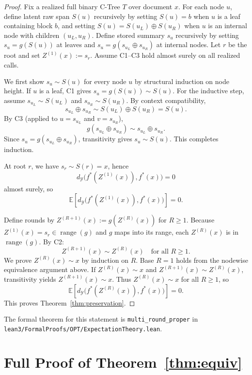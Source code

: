 \documentclass[11pt]{article}
\newcommand{\E}{\mathbb{E}}
\newcommand{\Y}{\mathcal{Y}}
\newcommand{\metric}{d_{\Y}}
\newcommand{\fstar}{f^\ast}
\newcommand{\concat}{\oplus}
\begin{document}
\begin{proof}
Fix a realized full binary C-Tree $T$ over document $x$.
For each node $u$, define latent raw span $S(u)$ recursively by setting $S(u)=b$ when $u$ is a leaf containing block $b$, and setting $S(u)=S(u_L)\concat S(u_R)$ when $u$ is an internal node with children $(u_L,u_R)$.
Define stored summary $s_u$ recursively by setting $s_u=g(S(u))$ at leaves and $s_u=g(s_{u_L}\concat s_{u_R})$ at internal nodes.
Let $r$ be the root and set $Z^{(1)}(x):=s_r$.
Assume C1--C3 hold almost surely on all realized calls.

We first show $s_u\sim S(u)$ for every node $u$ by structural induction on node height. If $u$ is a leaf, C1 gives $s_u=g(S(u))\sim S(u)$. For the inductive step, assume $s_{u_L}\sim S(u_L)$ and $s_{u_R}\sim S(u_R)$.
By context compatibility,
\[
s_{u_L}\concat s_{u_R}\sim S(u_L)\concat S(u_R)=S(u).
\]
By C3 (applied to $u=s_{u_L}$ and $v=s_{u_R}$),
\[
g(s_{u_L}\concat s_{u_R})\sim s_{u_L}\concat s_{u_R}.
\]
Since $s_u=g(s_{u_L}\concat s_{u_R})$, transitivity gives $s_u\sim S(u)$.
This completes induction.

At root $r$, we have $s_r\sim S(r)=x$, hence
\[
\metric\!\big(\fstar(Z^{(1)}(x)),\fstar(x)\big)=0
\]
almost surely, so
\[
\E\!\left[\metric\!\big(\fstar(Z^{(1)}(x)),\fstar(x)\big)\right]=0.
\]

Define rounds by $Z^{(R+1)}(x):=g(Z^{(R)}(x))$ for $R\ge1$.
Because $Z^{(1)}(x)=s_r\in\operatorname{range}(g)$ and $g$ maps into its range, each $Z^{(R)}(x)$ is in $\operatorname{range}(g)$.
By C2:
\[
Z^{(R+1)}(x)\sim Z^{(R)}(x)\quad\text{for all }R\ge1.
\]
We prove $Z^{(R)}(x)\sim x$ by induction on $R$.
Base $R=1$ holds from the nodewise equivalence argument above.
If $Z^{(R)}(x)\sim x$ and $Z^{(R+1)}(x)\sim Z^{(R)}(x)$, transitivity yields $Z^{(R+1)}(x)\sim x$.
Thus $Z^{(R)}(x)\sim x$ for all $R\ge1$, so
\[
\E\!\left[\metric\!\big(\fstar(Z^{(R)}(x)),\fstar(x)\big)\right]=0.
\]
This proves Theorem~\ref{thm:preservation}.
\end{proof}

The formal theorem for this statement is
\texttt{multi\_round\_proper} in
\texttt{lean3/FormalProofs/OPT/ExpectationTheory.lean}.

\section{Full Proof of Theorem~\ref{thm:equiv}}\label{app:proof-equivalence}
\end{document}
